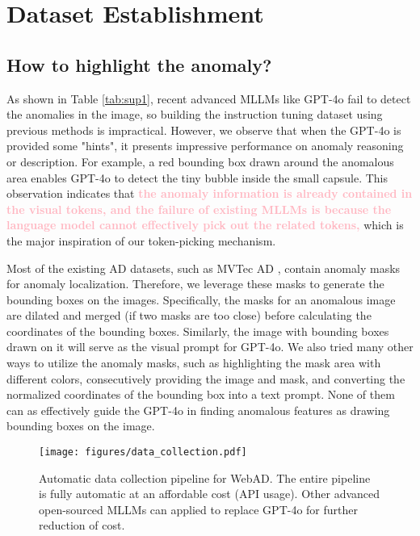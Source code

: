 \clearpage
\setcounter{section}{0}
\renewcommand\thesection{A\arabic{section}}

\section{Dataset Establishment}
\label{sup_dataset}

\subsection{How to highlight the anomaly?}

\noindent
As shown in Table \ref{tab:sup1}, recent advanced MLLMs like GPT-4o fail to detect the anomalies in the image, so building the instruction tuning dataset using previous methods \cite{sharegpt4v} is impractical. However, we observe that when the GPT-4o is provided some "hints", it presents impressive performance on anomaly reasoning or description. For example, a red bounding box drawn around the anomalous area enables GPT-4o to detect the tiny bubble inside the small capsule. This observation indicates that \textcolor{lightpink}{\textbf{the anomaly information is already contained in the visual tokens, and the failure of existing MLLMs is because the language model cannot effectively pick out the related tokens,}} which is the major inspiration of our token-picking mechanism.


Most of the existing AD datasets, such as MVTec AD \cite{mvtec}, contain anomaly masks for anomaly localization. Therefore, we leverage these masks to generate the bounding boxes on the images. Specifically, the masks for an anomalous image are dilated and merged (if two masks are too close) before calculating the coordinates of the bounding boxes. Similarly, the image with bounding boxes drawn on it will serve as the visual prompt for GPT-4o. We also tried many other ways to utilize the anomaly masks, such as highlighting the mask area with different colors, consecutively providing the image and mask, and converting the normalized coordinates of the bounding box into a text prompt. None of them can as effectively guide the GPT-4o in finding anomalous features as drawing bounding boxes on the image.




\begin{figure*}[!t]
\centering
    \texttt{[image: figures/data\_collection.pdf]}
\caption{Automatic data collection pipeline for WebAD. The entire pipeline is fully automatic at an affordable cost (API usage). Other advanced open-sourced MLLMs can applied to replace GPT-4o for further reduction of cost.}
\label{fig:data_collect}
\end{figure*}

